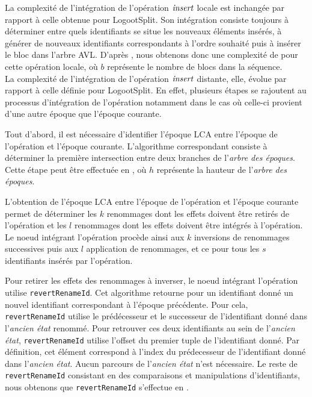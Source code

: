 La complexité de l'intégration de l'opération $\mathit{insert}$ locale est inchangée par rapport à celle obtenue pour LogootSplit.
Son intégration consiste toujours à déterminer entre quels identifiants se situe les nouveaux éléments insérés, à générer de nouveaux identifiants correspondants à l'ordre souhaité puis à insérer le bloc dans l'arbre AVL.
D'après \cite{2013-logootsplit}, nous obtenons donc une complexité de  pour cette opération locale, où $b$ représente le nombre de blocs dans la séquence.\\

La complexité de l'intégration de l'opération $\mathit{insert}$ distante, elle, évolue par rapport à celle définie pour LogootSplit.
En effet, plusieurs étapes se rajoutent au processus d'intégration de l'opération notamment dans le cas où celle-ci provient d'une autre époque que l'époque courante.

Tout d'abord, il est nécessaire d'identifier l'époque \ac{LCA} entre l'époque de l'opération et l'époque courante.
L'algorithme correspondant consiste à déterminer la première intersection entre deux branches de l'\emph{arbre des époques}.
Cette étape peut être effectuée en , où $h$ représente la hauteur de l'\emph{arbre des époques}.

L'obtention de l'époque \ac{LCA} entre l'époque de l'opération et l'époque courante permet de déterminer les $k$ renommages dont les effets doivent être retirés de l'opération et les $l$ renommages dont les effets doivent être intégrés à l'opération.
Le noeud intégrant l'opération procède ainsi aux $k$ inversions de renommages successives puis aux $l$ application de renommages, et ce pour tous les $s$ identifiants insérés par l'opération.

Pour retirer les effets des renommages à inverser, le noeud intégrant l'opération utilise \texttt{revertRenameId}.
Cet algorithme retourne pour un identifiant donné un nouvel identifiant correspondant à l'époque précédente.
Pour cela, \texttt{revertRenameId} utilise le prédécesseur et le successeur de l'identifiant donné dans l'\emph{ancien état} renommé.
Pour retrouver ces deux identifiants au sein de l'\emph{ancien état}, \texttt{revertRenameId} utilise l'offset du premier tuple de l'identifiant donné.
Par définition, cet élément correspond à l'index du prédecesseur de l'identifiant donné dans l'\emph{ancien état}.
Aucun parcours de l'\emph{ancien état} n'est nécessaire.
Le reste de \texttt{revertRenameId} consistant en des comparaisons et manipulations d'identifiants, nous obtenons que \texttt{revertRenameId} s'effectue en .

